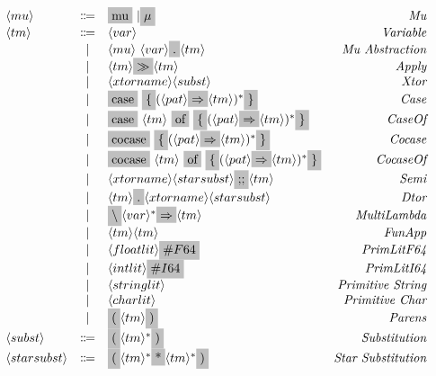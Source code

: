 \documentclass[11pt]{article}
\newcommand{\nonterminal}[1]{\langle #1 \rangle}
\newcommand{\terminal}[1]{\colorbox{lightgray}{\vphantom{X}#1}}
\begin{document}
\[
  \begin{array}{lclr}
    \nonterminal{mu} & \Coloneqq & \terminal{mu}\ | \terminal{$\mu$} & \emph{Mu} \\
    \nonterminal{tm} & \Coloneqq & \nonterminal{var} & \emph{Variable} \\
    & | & \nonterminal{mu}\ \nonterminal{var} \terminal{.} \nonterminal{tm} & \textit{Mu Abstraction} \\
    & | & \nonterminal{tm} \terminal{$\gg$} \nonterminal{tm} & \textit{Apply} \\
    & | & \nonterminal{xtorname}\nonterminal{subst} & \emph{Xtor} \\
    & | & \terminal{case}\ \terminal{\{} (\nonterminal{pat} \terminal{$\Rightarrow$} \nonterminal{tm})^{\ast} \terminal{\}} & \emph{Case} \\
    & | & \terminal{case}\ \nonterminal{tm}\ \terminal{of}\ \terminal{\{} (\nonterminal{pat} \terminal{$\Rightarrow$} \nonterminal{tm})^{\ast} \terminal{\}} & \emph{CaseOf} \\
    & | & \terminal{cocase}\ \terminal{\{} (\nonterminal{pat} \terminal{$\Rightarrow$} \nonterminal{tm})^{\ast} \terminal{\}} & \emph{Cocase} \\
    & | & \terminal{cocase}\ \nonterminal{tm}\ \terminal{of}\ \terminal{\{} (\nonterminal{pat} \terminal{$\Rightarrow$} \nonterminal{tm})^{\ast} \terminal{\}} & \emph{CocaseOf} \\
    & | & \nonterminal{xtorname}\nonterminal{starsubst}\terminal{;;}\nonterminal{tm} & \emph{Semi} \\
    & | & \nonterminal{tm}\terminal{.}\nonterminal{xtorname}\nonterminal{starsubst} & \emph{Dtor} \\
    & | & \terminal{$\backslash$} \nonterminal{var}^{\ast}\terminal{$\Rightarrow$} \nonterminal{tm} & \emph{MultiLambda} \\
    & | & \nonterminal{tm} \nonterminal{tm} & \emph{FunApp} \\
    & | & \nonterminal{floatlit}\terminal{$\#F64$} & \emph{PrimLitF64} \\
    & | & \nonterminal{intlit}\terminal{$\#I64$} & \emph{PrimLitI64} \\
    & | & \nonterminal{stringlit} & \emph{Primitive String} \\
    & | & \nonterminal{charlit} & \emph{Primitive Char} \\
    & | & \terminal{(} \nonterminal{tm} \terminal{)} & \emph{Parens} \\
    \nonterminal{subst} & \Coloneqq & \terminal{(} \nonterminal{tm}^{\ast} \terminal{)} & \emph{Substitution} \\
    \nonterminal{starsubst} & \Coloneqq & \terminal{(} \nonterminal{tm}^{\ast} \terminal{*} \nonterminal{tm}^{\ast} \terminal{)} & \emph{Star Substitution} \\ 
  \end{array}
\]
\end{document}
